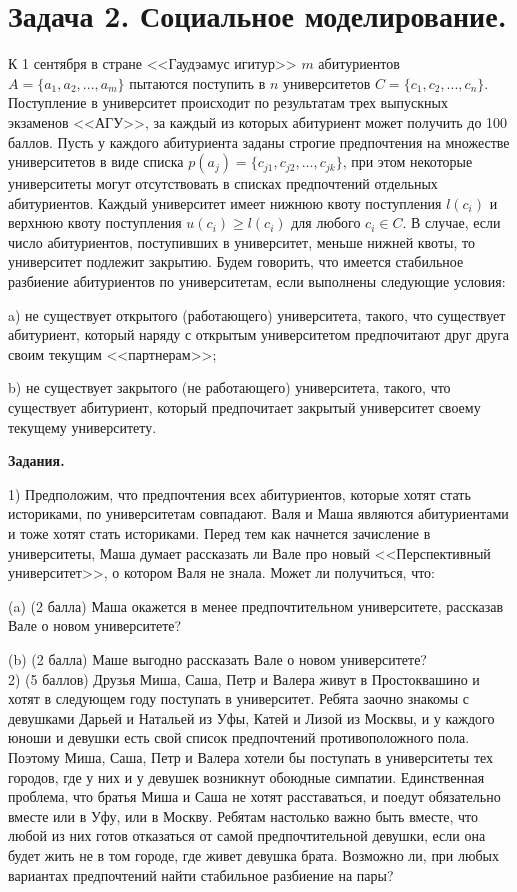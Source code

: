 \documentclass[a4paper, 12pt]{article}
\begin{document}

\section*{Задача 2. Социальное моделирование.}

К 1 сентября в стране <<Гаудэамус игитур>> $m$ абитуриентов $A=\{a_1,a_2,...,a_m\}$ пытаются поступить в $n$ университетов $C=\{c_1, c_2, ..., c_n\}$.
Поступление в университет происходит по результатам трех выпускных экзаменов <<АГУ>>, за каждый из которых абитуриент может получить до 100 баллов.
Пусть у каждого абитуриента заданы строгие предпочтения на множестве университетов в виде списка $p(a_j)=\{c_{j1},  c_{j2}, ..., c_{jk}\}$, при этом некоторые университеты могут отсутствовать в списках предпочтений отдельных абитуриентов.
Каждый университет имеет нижнюю квоту поступления $l(c_i)$ и верхнюю квоту поступления $u(c_i)\geqslant l(c_i)$ для любого $c_i\in C$.
В случае, если число абитуриентов, поступивших в университет, меньше нижней квоты, то университет подлежит закрытию.
Будем говорить, что имеется стабильное разбиение абитуриентов по университетам, если выполнены следующие условия:

a) не существует открытого (работающего) университета, такого, что существует абитуриент, который наряду с открытым университетом предпочитают друг друга своим текущим
<<партнерам>>;

b) не существует закрытого (не работающего) университета, такого, что существует абитуриент, который предпочитает закрытый университет своему текущему университету.

\textbf{Задания.}

1) Предположим, что предпочтения всех абитуриентов, которые хотят стать историками, по университетам совпадают.
Валя и Маша являются абитуриентами и тоже хотят стать историками.
Перед тем как начнется зачисление в университеты, Маша думает рассказать ли Вале про новый <<Перспективный университет>>, о котором Валя не знала.
Может ли получиться, что:

(a) (2 балла) Маша окажется в менее предпочтительном университете, рассказав Вале о новом университете?

(b) (2 балла) Маше выгодно рассказать Вале о новом университете?
\\

2) (5 баллов) Друзья Миша, Саша, Петр и Валера живут в Простоквашино и хотят в следующем году поступать в университет.
Ребята заочно знакомы с девушками Дарьей и Натальей из Уфы, Катей и Лизой из Москвы, и у каждого юноши и девушки есть свой список предпочтений противоположного пола.
Поэтому Миша, Саша, Петр и Валера хотели бы поступать в университеты тех городов, где у них и у девушек возникнут обоюдные симпатии.
Единственная проблема, что братья Миша и Саша не хотят расставаться, и поедут обязательно вместе или в Уфу, или в Москву.
Ребятам настолько важно быть вместе, что любой из них готов отказаться от самой предпочтительной девушки, если она будет жить не в том городе, где живет девушка брата.
Возможно ли, при любых вариантах предпочтений найти стабильное разбиение на пары?
\\
\end{document}
